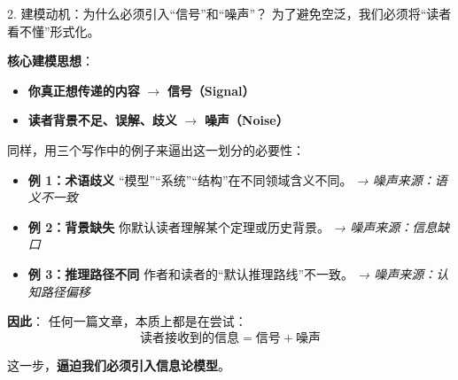 \documentclass[11pt, a4paper]{ctexart}
\newcommand{\lowfreq}[1]{%
	{\Large\bfseries\color{red!60!black} #1}%
}
\begin{document}
\begin{mathbox}{2. 建模动机：为什么必须引入“信号”和“噪声”？}
	为了避免空泛，我们必须将“读者看不懂”形式化。
	
	\textbf{核心建模思想}：  
	\begin{itemize}
		\item \textbf{你真正想传递的内容} $\rightarrow$ \lowfreq{信号（Signal）}
		\item \textbf{读者背景不足、误解、歧义} $\rightarrow$ \lowfreq{噪声（Noise）}
	\end{itemize}
	
	\vspace{0.5em}
	同样，用三个写作中的例子来逼出这一划分的必要性：
	
	\begin{itemize}
		\item \textbf{例 1：术语歧义}  
		“模型”“系统”“结构”在不同领域含义不同。  
		\textit{→ 噪声来源：语义不一致}
		
		\item \textbf{例 2：背景缺失}  
		你默认读者理解某个定理或历史背景。  
		\textit{→ 噪声来源：信息缺口}
		
		\item \textbf{例 3：推理路径不同}  
		作者和读者的“默认推理路线”不一致。  
		\textit{→ 噪声来源：认知路径偏移}
	\end{itemize}
	
	\textbf{因此}：  
	任何一篇文章，本质上都是在尝试：
	$$
	\text{读者接收到的信息} = \text{信号} + \text{噪声}
	$$
	
	这一步，\textbf{逼迫我们必须引入信息论模型}。
\end{mathbox}
\end{document}
